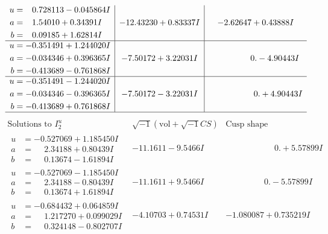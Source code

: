 \documentclass[1p]{elsarticle_modified}
\theoremstyle{definition}
\newcommand{\I}{\sqrt{-1}}
\begin{document}
$$\begin{array}{c|c|c}
\begin{aligned}
u &= \phantom{-}0.728113 - 0.045864 I \\
a &= \phantom{-}1.54010 + 0.34391 I \\
b &= \phantom{-}0.09185 + 1.62814 I\end{aligned}
 & -12.43230 + 0.83337 I & -2.62647 + 0.43888 I \\ \hline\begin{aligned}
u &= -0.351491 + 1.244020 I \\
a &= -0.034346 + 0.396365 I \\
b &= -0.413689 - 0.761868 I\end{aligned}
 & -7.50172 + 3.22031 I & \phantom{-0.000000 } 0. - 4.90443 I \\ \hline\begin{aligned}
u &= -0.351491 - 1.244020 I \\
a &= -0.034346 - 0.396365 I \\
b &= -0.413689 + 0.761868 I\end{aligned}
 & -7.50172 - 3.22031 I & \phantom{-0.000000 -}0. + 4.90443 I\\
 \hline 
 \end{array}$$\newpage$$\begin{array}{c|c|c}  
\text{Solutions to }I^u_{2}& \I (\text{vol} + \sqrt{-1}CS) & \text{Cusp shape}\\
 \hline 
\begin{aligned}
u &= -0.527069 + 1.185450 I \\
a &= \phantom{-}2.34188 + 0.80439 I \\
b &= \phantom{-}0.13674 - 1.61894 I\end{aligned}
 & -11.1611 - 9.5466 I & \phantom{-0.000000 -}0. + 5.57899 I \\ \hline\begin{aligned}
u &= -0.527069 - 1.185450 I \\
a &= \phantom{-}2.34188 - 0.80439 I \\
b &= \phantom{-}0.13674 + 1.61894 I\end{aligned}
 & -11.1611 + 9.5466 I & \phantom{-0.000000 } 0. - 5.57899 I \\ \hline\begin{aligned}
u &= -0.684432 + 0.064859 I \\
a &= \phantom{-}1.217270 + 0.099029 I \\
b &= \phantom{-}0.324148 - 0.802707 I\end{aligned}
 & -4.10703 + 0.74531 I & -1.080087 + 0.735219 I \\ \hline\begin{aligned}

\end{aligned}
\end{array}$$
\end{document}
